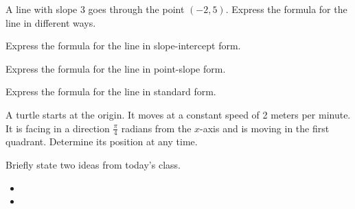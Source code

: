
\begin{problem}
\item A line with slope 3 goes through the point $(-2,5)$. Express the
  formula for the line in different ways.
  \begin{subproblem}
  \item Express the formula for the line in slope-intercept form.
    \vfill
  \item Express the formula for the line in point-slope form.
    \vfill
  \item Express the formula for the line in standard form.
    \vfill
  \end{subproblem}

  \clearpage

\item A turtle starts at the origin. It moves at a constant speed of 2
  meters per minute. It is facing in a direction $\frac{\pi}{4}$
  radians from the $x$-axis and is moving in the first
  quadrant. Determine its position at any time.

  \clearpage

\end{problem}


\begin{problem}
\item 
  \begin{subproblem}
    \item
  \end{subproblem}
\end{problem}


\postClass

\begin{problem}
\item Briefly state two ideas from today's class.
  \begin{itemize}
  \item 
  \item 
  \end{itemize}
\item 
  \begin{subproblem}
    \item
  \end{subproblem}
\end{problem}




